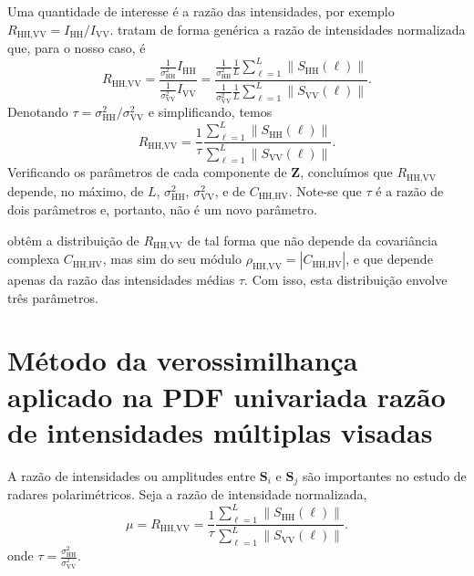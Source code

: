 \documentclass[12pt]{article}
\begin{document}
Uma quantidade de interesse é a razão das intensidades, por exemplo $R_{\text{HH,VV}} = I_{\text{HH}} / I_{\text{VV}}$.
\citet{lee} tratam de forma genérica a razão de intensidades normalizada que, para o nosso caso, é
$$
R_{\text{HH,VV}} = \frac{\frac1{\sigma_{\text{HH}}^2}I_{\text{HH}}}
						{\frac1{\sigma_{\text{VV}}^2}I_{\text{VV}}} = 
	\frac{\frac1{\sigma_{\text{HH}}^2} \frac1L \sum_{\ell=1}^{L}\|S_{\text{HH}}(\ell)\|}
	{\frac1{\sigma_{\text{VV}}^2} \frac1L \sum_{\ell=1}^{L}\|S_{\text{VV}}(\ell)\|}.
$$
Denotando $\tau = \sigma_{\text{HH}}^2 / \sigma_{\text{VV}}^2$ e simplificando, temos
$$
R_{\text{HH,VV}} = \frac{1}{\tau}
\frac{\sum_{\ell=1}^{L}\|S_{\text{HH}}(\ell)\|}
{\sum_{\ell=1}^{L}\|S_{\text{VV}}(\ell)\|}.
$$
Verificando os parâmetros de cada componente de $\bm Z$, concluímos que $R_{\text{HH,VV}}$ depende, no máximo, de $L$, $\sigma_{\text{HH}}^2$, $\sigma_{\text{VV}}^2$, e de $C_{\text{HH,HV}}$.
Note-se que $\tau$ é a razão de dois parâmetros e, portanto, não é um novo parâmetro.

\citet{lee} obtêm a distribuição de $R_{\text{HH,VV}}$ de tal forma que não depende da covariância complexa $C_{\text{HH,HV}}$, mas sim do seu módulo $\rho_{\text{HH,VV}}=|C_{\text{HH,HV}}|$, e que depende apenas da razão das intensidades médias $\tau$.
Com isso, esta distribuição envolve três parâmetros.


\section{Método da verossimilhança aplicado na PDF univariada razão de intensidades múltiplas visadas}
A razão de intensidades ou amplitudes entre $\mathbf{S}_i$ e $\mathbf{S}_j$ são importantes no estudo de radares polarimétricos. Seja a razão de intensidade normalizada,
\begin{equation}\label{eq:razao_intensidades}
 \mu=R_{\text{HH,VV}} = \frac{1}{\tau}
\frac{\sum_{\ell=1}^{L}\|S_{\text{HH}}(\ell)\|}
{\sum_{\ell=1}^{L}\|S_{\text{VV}}(\ell)\|}.
\end{equation}
onde $\tau=\frac{\sigma^2_{\text{HH}}}{\sigma^2_{\text{VV}}}$.
  
\end{document}
